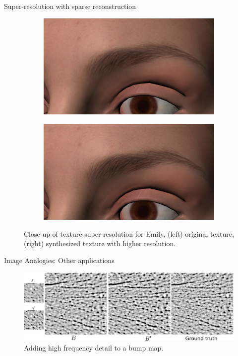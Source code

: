\documentclass{beamer}
\begin{document}
\begin{frame}{Super-resolution with sparse reconstruction}

\begin{figure}
        \centering
        \begin{subfigure}[b]{0.48\textwidth}
                \includegraphics[width=\textwidth]{img/emily_close_original}
        \end{subfigure}
        \begin{subfigure}[b]{0.48\textwidth}
                \includegraphics[width=\textwidth]{img/emily_close_sr}
        \end{subfigure}
        \caption{Close up of texture super-resolution for Emily, (left) original texture, (right) synthesized texture with higher resolution.}
\end{figure}

\end{frame}


\begin{frame}{Image Analogies: Other applications}
\begin{figure}
        \centering
        \includegraphics[width=\textwidth]{img/bump_maps}
        \caption{Adding high frequency detail to a bump map.}
\end{figure}
\end{frame}
\end{document}
